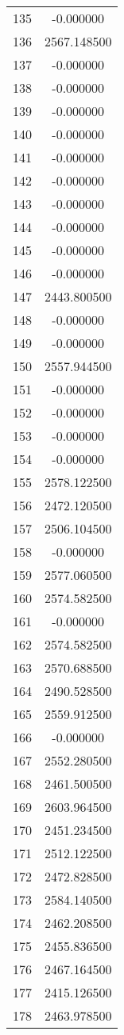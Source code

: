 \documentclass[12pt]{article}
\begin{document}
\begin{longtable}{@{}cc@{}}
135 & -0.000000 \\
136 & 2567.148500 \\
137 & -0.000000 \\
138 & -0.000000 \\
139 & -0.000000 \\
140 & -0.000000 \\
141 & -0.000000 \\
142 & -0.000000 \\
143 & -0.000000 \\
144 & -0.000000 \\
145 & -0.000000 \\
146 & -0.000000 \\
147 & 2443.800500 \\
148 & -0.000000 \\
149 & -0.000000 \\
150 & 2557.944500 \\
151 & -0.000000 \\
152 & -0.000000 \\
153 & -0.000000 \\
154 & -0.000000 \\
155 & 2578.122500 \\
156 & 2472.120500 \\
157 & 2506.104500 \\
158 & -0.000000 \\
159 & 2577.060500 \\
160 & 2574.582500 \\
161 & -0.000000 \\
162 & 2574.582500 \\
163 & 2570.688500 \\
164 & 2490.528500 \\
165 & 2559.912500 \\
166 & -0.000000 \\
167 & 2552.280500 \\
168 & 2461.500500 \\
169 & 2603.964500 \\
170 & 2451.234500 \\
171 & 2512.122500 \\
172 & 2472.828500 \\
173 & 2584.140500 \\
174 & 2462.208500 \\
175 & 2455.836500 \\
176 & 2467.164500 \\
177 & 2415.126500 \\
178 & 2463.978500 \\

\end{longtable}
\end{document}
